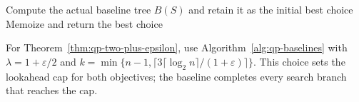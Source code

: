 \begin{algorithm}[H]
\caption{\Rollout: exact initial-tree optimization with a baseline}
\label{alg:rollout}
Compute the actual baseline tree $B(S)$ and retain it as the initial best choice\;
Memoize and return the best choice\;
\end{algorithm}

For Theorem~\ref{thm:qp-two-plus-epsilon}, use Algorithm~\ref{alg:qp-baselines}
with $\lambda=1+\varepsilon/2$ and
$k=\min\{n-1,\lceil3\lceil\log_2n\rceil/(1+\varepsilon)\rceil\}$.
This choice sets the lookahead cap for both objectives; the baseline
completes every search branch that reaches the cap.
